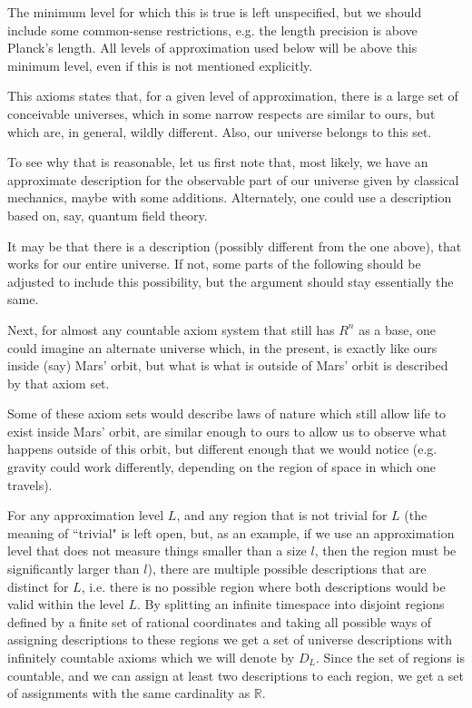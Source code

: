 \documentclass[a4paper
,draft
]{article}
\def\reale{\mathbb{R}}
\def\descriptions{D_L}
\newcommand{\ghilimele}[1]{``#1"}
\begin{document}
The minimum level for which this is true is left unspecified, but we should
include some common-sense restrictions, e.g. the length precision is above
Planck's length. All levels of approximation used below will be above this
minimum level, even if this is not mentioned explicitly.

This axioms states that, for a given level of approximation,
there is a large set of conceivable universes, which in some narrow respects
are similar to ours, but which are, in general, wildly different.
Also, our universe belongs to this set.

To see why that is reasonable, let us first note that,
most likely, we have an approximate description for the observable part
of our universe
given by classical mechanics, maybe with some additions.
Alternately, one could use a description based on, say, quantum field theory.

It may be that there is a description (possibly different from the one above),
that works for our entire universe.
If not, some parts of the following should
be adjusted to include this possibility, but the argument should stay
essentially the same.

Next, for almost any countable axiom system that still
has $R^n$ as a base, one could imagine an alternate universe
which, in the present, is exactly like ours inside (say) Mars' orbit,
but what is what is outside of Mars' orbit is described by that axiom set.

Some of these axiom sets would describe laws of nature which still allow life
to exist inside Mars' orbit, are similar enough
to ours to allow us to observe what happens outside of this orbit,
but different enough that
we would notice (e.g. gravity could work differently, depending on the region
of space in which one travels).

For any approximation level $L$, and any region that is not trivial
for $L$
(the meaning of \ghilimele{trivial} is left open, but, as an example,
if we use an approximation level that does not measure things smaller
than a size $l$, then the region must be significantly larger than $l$),
there are multiple possible descriptions that
are distinct for $L$, i.e. there is no possible region where both descriptions
would be valid within the level $L$.
By splitting an infinite timespace
into disjoint regions defined by a finite set of rational coordinates
and taking all possible ways of assigning descriptions to these regions
we get a set of universe descriptions with infinitely countable axioms
which we will denote by $\descriptions$.
Since the set of regions is countable, and we can assign at least two
descriptions to each region, we get a set of assignments with the same
cardinality as $\reale$.
\end{document}
